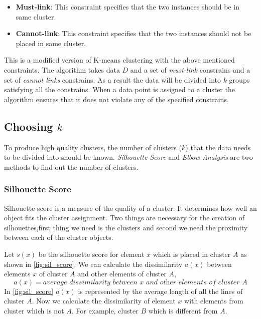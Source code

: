 \begin{itemize}
    \item \textbf{Must-link}: This constraint specifies that the two instances should be in same cluster.
    \item \textbf{Cannot-link}: This constraint specifies that the two instances should not be placed in same cluster.
\end{itemize}

This is a modified version of K-means clustering with the above mentioned constraints. The algorithm takes data $D$ and a set of \textit{must-link} constrains and a set of \textit{cannot links} constrains. As a result the data will be divided into $k$ groups satisfying all the constrains. When a data point is assigned to a cluster the algorithm ensures that it does not violate any of the specified constrains.



\subsection{Choosing $k$}
To produce high quality clusters, the number of clusters ($k$) that the data needs to be divided into should be known. \textit{Silhouette Score} \cite{rousseeuw1987silhouettes} and \textit{Elbow Analysis} \cite{thorndike1953belongs,ketchen1996application}  are two methods to find out the number of clusters.

\subsubsection{Silhouette Score}
Silhouette score is a measure of the quality of a cluster. It determines how well an object fits the cluster assignment. Two things are necessary for the creation of silhouettes,first thing we need is the clusters and second we need the proximity between each of the cluster objects.

Let $s(x)$ be the silhouette score for element $x$ which is placed in cluster $A$ as shown in \ref{fig:sil_score}. We can calculate the dissimilarity $a(x)$ between elements $x$ of cluster $A$ and other elements of cluster $A$,
\begin{equation}\label{eq:sil_1}
    a(x) = \textit{average dissimilarity between x and other elements of cluster A}
\end{equation}
In \ref{fig:sil_score} $a(x)$ is represented by the average length of all the lines of cluster $A$. Now we calculate the dissimilarity of element $x$ with elements from cluster which is not $A$. For example, cluster $B$ which is different from $A$.

